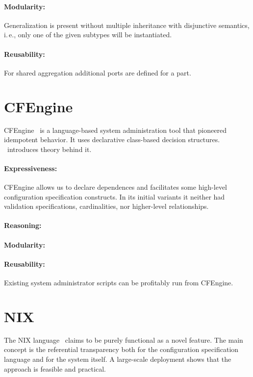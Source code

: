 \paragraph*{Modularity:}
Generalization is present without multiple inheritance with disjunctive semantics, i.\,e., only one of the given subtypes will be instantiated.

\paragraph*{Reusability:}
For shared aggregation additional ports are defined for a part.




\section{CFEngine}

CFEngine~\cite{burgess1995cfengine,pandey2012investigating} is a language-based system administration tool that pioneered idempotent behavior.
It uses declarative class-based decision structures.
\citet{burgess2003theory}~introduces theory behind it.

\paragraph*{Expressiveness:}
CFEngine allows us to declare dependences and facilitates some high-level configuration specification constructs.
In its initial variants it neither had validation specifications, cardinalities, nor higher-level relationships.
\paragraph*{Reasoning:}
\notsupported{}
\paragraph*{Modularity:}
\notsupported{}

\paragraph*{Reusability:}
Existing system administrator scripts can be profitably run from CFEngine.


\section{NIX}

The NIX language~\cite{dolstra2007purely} claims to be purely functional as a novel feature.
The main concept is the referential transparency both for the configuration specification language and for the system itself.
A large-scale deployment shows that the approach is feasible and practical.

